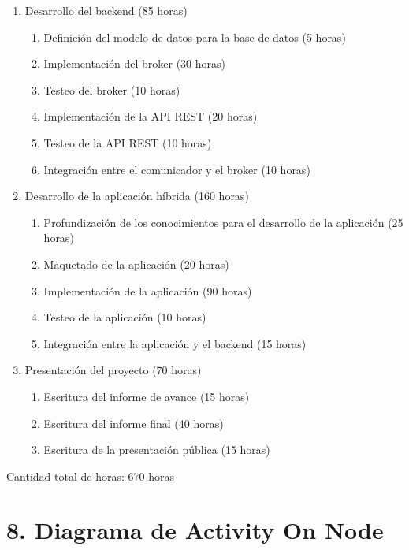 \documentclass[
11pt, %
codirector, %
]{charter}
\begin{document}
\begin{enumerate}
	\item Desarrollo del backend (85 horas)
		\begin{enumerate}
			\item Definición del modelo de datos para la base de datos (5 horas)
			\item Implementación del broker (30 horas)
			\item Testeo del broker (10 horas)
			\item Implementación de la API REST (20 horas)
			\item Testeo de la API REST (10 horas)
			\item Integración entre el comunicador y el broker (10 horas)
		\end{enumerate}
	\item Desarrollo de la aplicación híbrida (160 horas)
		\begin{enumerate}
			\item Profundización de los conocimientos para el desarrollo de la aplicación (25 horas)
			\item Maquetado de la aplicación (20 horas)
			\item Implementación de la aplicación (90 horas)
			\item Testeo de la aplicación (10 horas)
			\item Integración entre la aplicación y el backend (15 horas)
		\end{enumerate}
	\item Presentación del proyecto (70 horas)
		\begin{enumerate}
			\item Escritura del informe de avance (15 horas)
			\item Escritura del informe final (40 horas)
			\item Escritura de la presentación pública (15 horas)
		\end{enumerate}
\end{enumerate}

Cantidad total de horas: 670 horas


\section{8. Diagrama de Activity On Node}
\label{sec:AoN}
\end{document}
